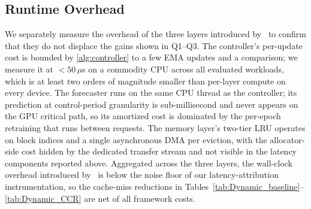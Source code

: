 \begin{table}[t]
\centering
\renewcommand{\arraystretch}{1.2}
\caption{Cache-miss latency (s/request) with cache-aware routing enabled.}
\label{tab:Dynamic_CCR}
\end{table}

\subsection{Runtime Overhead}
\label{sec:eval:overhead}

We separately measure the overhead of the three layers introduced by
\systemname\ to confirm that they do not displace the gains shown in
Q1--Q3. The controller's per-update cost is bounded by \autoref{alg:controller}
to a few EMA updates and a comparison; we measure it at $<50\,\mu$s
on a commodity CPU across all evaluated workloads, which is at least
two orders of magnitude smaller than per-layer compute on every
device. The forecaster runs on the same CPU thread as the
controller; its prediction at control-period granularity is
sub-millisecond and never appears on the GPU critical path, so its
amortized cost is dominated by the per-epoch retraining that runs
between requests. The memory layer's two-tier LRU operates on block
indices and a single asynchronous DMA per eviction, with the
allocator-side cost hidden by the dedicated transfer stream and not
visible in the latency components reported above. Aggregated across
the three layers, the wall-clock overhead introduced by \systemname\
is below the noise floor of our latency-attribution instrumentation,
so the cache-miss reductions in
Tables~\ref{tab:Dynamic_baseline}--\ref{tab:Dynamic_CCR} are net of
all framework costs.

